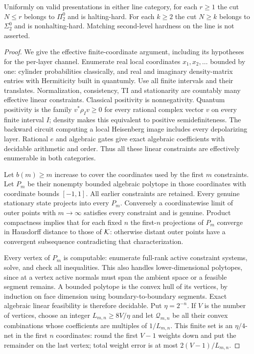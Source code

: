 \begin{theorem}\label{thm:line-cuts}
Uniformly on valid presentations in either line category, for each
$r\ge1$ the cut $N\le r$ belongs to $\Pi^0_2$ and is halting-hard.
For each $k\ge2$ the cut $N\ge k$ belongs to $\Sigma^0_2$ and is
nonhalting-hard. Matching second-level hardness on the line is not
asserted.
\end{theorem}
\begin{proof}
We give the effective finite-coordinate argument, including its
hypotheses for the per-layer channel. Enumerate real local coordinates
$x_1,x_2,\ldots$ bounded by one: cylinder probabilities classically,
and real and imaginary density-matrix entries with Hermiticity
built in quantumly. Use all finite intervals and their translates.
Normalization, consistency, TI and stationarity are countably many
effective linear constraints. Classical positivity is nonnegativity.
Quantum positivity is the family
$v^*\rho_Iv\ge0$ for every rational complex vector $v$ on every
finite interval $I$; density makes this equivalent to positive
semidefiniteness. The backward circuit computing a local Heisenberg
image includes every depolarizing layer. Rational $e$ and algebraic
gates give exact algebraic coefficients with decidable arithmetic
and order. Thus all these linear constraints are effectively
enumerable in both categories.

Let $b(m)\ge m$ increase to cover the coordinates used by the first
$m$ constraints. Let $P_m$ be their nonempty bounded algebraic
polytope in those coordinates with coordinate bounds $[-1,1]$.
All earlier constraints are retained. Every genuine stationary
state projects into every $P_m$. Conversely a coordinatewise limit
of outer points with $m\to\infty$ satisfies every constraint and
is genuine. Product compactness implies that for each fixed $n$
the first-$n$ projections of $P_m$ converge in Hausdorff distance
to those of $\mathcal K$: otherwise distant outer points have a convergent
subsequence contradicting that characterization.

Every vertex of $P_m$ is computable: enumerate full-rank active
constraint systems, solve, and check all inequalities. This also
handles lower-dimensional polytopes, since at a vertex active
normals must span the ambient space or a feasible segment remains.
A bounded polytope is the convex hull of its vertices, by induction
on face dimension using boundary-to-boundary segments. Exact
algebraic linear feasibility is therefore decidable.
Put $\eta=2^{-n}$. If $V$ is the number of vertices, choose an integer
$L_{m,n}\ge8V/\eta$ and let $\mathcal Q_{m,n}$ be all their convex
combinations whose coefficients are multiples of $1/L_{m,n}$.
This finite set is an $\eta/4$-net in the first $n$ coordinates:
round the first $V-1$ weights down and put the remainder on the
last vertex; total weight error is at most $2(V-1)/L_{m,n}$.


\end{proof}

